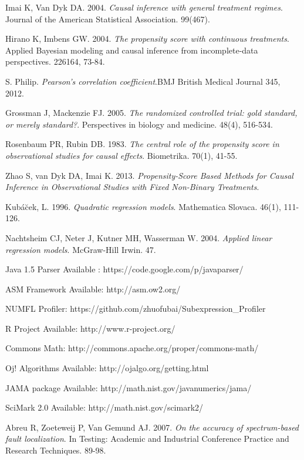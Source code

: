 \documentclass[times]{stvrauth}
\begin{document}
\begin{thebibliography}{9}
 Imai K, Van Dyk DA. 2004. {\it Causal inference with general treatment regimes}. Journal of the American Statistical Association. 99(467).

 Hirano K, Imbens GW. 2004. {\it The propensity score with continuous treatments}. Applied Bayesian modeling and causal inference from incomplete-data perspectives. 226164, 73-84.

 S. Philip.  {\it Pearson's correlation coefficient}.BMJ British Medical Journal 345, 2012.

 Grossman J, Mackenzie FJ. 2005. {\it The randomized controlled trial: gold standard, or merely standard?}. Perspectives in biology and medicine. 48(4), 516-534.

 Rosenbaum PR, Rubin DB. 1983. {\it The central role of the propensity score in observational studies for causal effects}. Biometrika. 70(1), 41-55.

 Zhao S, van Dyk DA, Imai K. 2013. {\it Propensity-Score Based Methods for Causal Inference in Observational Studies with Fixed Non-Binary Treatments}.

 Kub{\'a}{\u c}ek, L. 1996. {\it Quadratic regression models}. Mathematica Slovaca. 46(1), 111-126.

 Nachtsheim CJ, Neter J, Kutner MH, Wasserman W. 2004. {\it Applied linear regression models}. McGraw-Hill Irwin. 47.

 Java 1.5 Parser Available : https://code.google.com/p/javaparser/

 ASM Framework Available: http://asm.ow2.org/

 NUMFL Profiler: https://github.com/zhuofubai/Subexpression\_Profiler

 R Project Available: http://www.r-project.org/

 Commons Math: http://commons.apache.org/proper/commons-math/

 Oj! Algorithms Available: http://ojalgo.org/getting.html

 JAMA package Available: http://math.nist.gov/javanumerics/jama/

 SciMark 2.0 Available: http://math.nist.gov/scimark2/

 Abreu R, Zoeteweij P, Van Gemund AJ. 2007. {\it On the accuracy of spectrum-based fault localization}. In Testing: Academic and Industrial Conference Practice and Research Techniques. 89-98.


\end{thebibliography}
\end{document}
